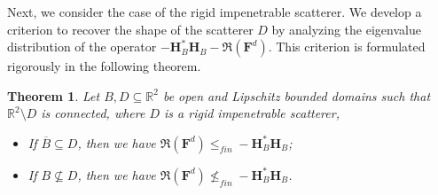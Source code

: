 \documentclass[11pt,reqno,twoside]{amsart}
\newtheorem{thm}{Theorem}[section]
\theoremstyle{definition}
\theoremstyle{remark}
\numberwithin{equation}{section}
\begin{document}
Next, we consider the case of the rigid impenetrable scatterer. We develop a criterion to recover the shape of the scatterer \( D \) by analyzing the eigenvalue distribution of the operator \( -\mathbf H^*_B\mathbf H_B-\Re\left(\mathbf F^d \right) \). This criterion is formulated rigorously in the following theorem.
\begin{thm}\label{Characterofimpenetrable scatterer}
	Let $B,D\subseteq \mathbb{R}^2$ be open and  Lipschitz bounded domains such that $\mathbb{R}^2\setminus D$ is connected, where $D$ is a rigid impenetrable scatterer,
	\begin{itemize}
		\item [(1).] If $\overline{B}\subseteq D$, then we have $\Re\left( \mathbf F^d\right) \leq_{fin} -\mathbf H^*_B\mathbf H_B$;
		\item [(2).] If $B\nsubseteq D$, then we have $\Re\left( \mathbf F^d\right) \nleq_{fin} -\mathbf H^*_B\mathbf H_B$.
	\end{itemize} 
\end{thm}
\end{document}
